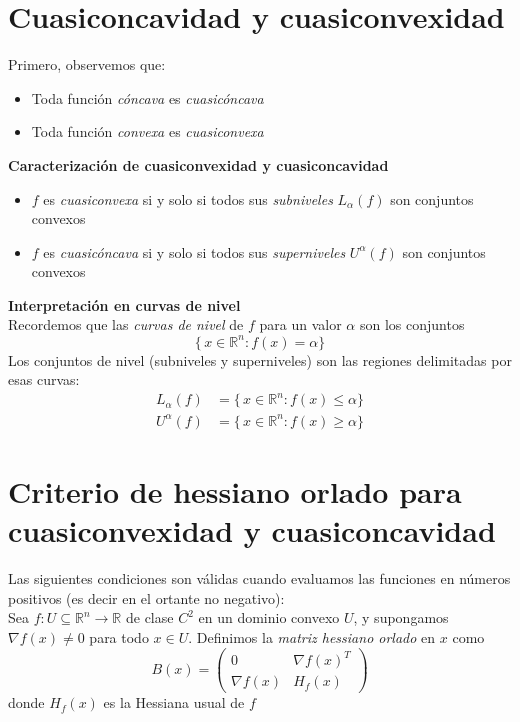 \documentclass{article}
\newcommand{\R}{\ensuremath{\mathbb{R}}}
\begin{document}
\section*{Cuasiconcavidad y cuasiconvexidad}

\noindent Primero, observemos que:
\begin{itemize}
  \item Toda función \emph{cóncava} es \emph{cuasicóncava}
  \item Toda función \emph{convexa} es \emph{cuasiconvexa}
\end{itemize}












\noindent\textbf{Caracterización de cuasiconvexidad y cuasiconcavidad}
\begin{itemize}
  \item \color{teal}\(f\) es \emph{cuasiconvexa} si y solo si todos sus \emph{subniveles} \(L_\alpha(f)\) son conjuntos convexos
  \item \color{teal}\(f\) es \emph{cuasicóncava} si y solo si todos sus \emph{superniveles} \(U^\alpha(f)\) son conjuntos convexos
\end{itemize}

\noindent\textbf{Interpretación en curvas de nivel}\\
Recordemos que las \emph{curvas de nivel} de \(f\) para un valor \(\alpha\) son los conjuntos
\[
\{\,x\in\R^n : f(x)=\alpha\}
\]
Los conjuntos de nivel (subniveles y superniveles) son las regiones delimitadas por esas curvas:
\[
\begin{aligned}
L_\alpha(f) &= \{\,x\in\R^n : f(x)\le \alpha\}\\[4pt]
U^\alpha(f) &= \{\,x\in\R^n : f(x)\ge \alpha\}
\end{aligned}
\]

\section*{Criterio de hessiano orlado para cuasiconvexidad y cuasiconcavidad}
Las siguientes condiciones son válidas cuando evaluamos las funciones en números positivos (es decir en el ortante no negativo):\\
Sea \(f\colon U\subseteq\mathbb{R}^n\to\mathbb{R}\) de clase \(C^2\) en un dominio convexo \(U\), y supongamos \(\nabla f(x)\neq0\) para todo \(x\in U\). Definimos la \emph{matriz hessiano orlado} en \(x\) como
\[
B(x)
=\begin{pmatrix}
0 & \nabla f(x)^T \\[4pt]
\nabla f(x) & H_f(x)
\end{pmatrix}
\]
donde \(H_f(x)\) es la Hessiana usual de \(f\)
\end{document}
